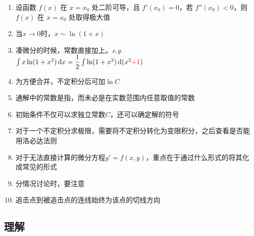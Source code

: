 \documentclass[../book.tex]{subfiles}
\begin{document}
    \begin{enumerate}
        \item 设函数 $f(x)$ 在 $x=x_0$ 处二阶可导，且 $f'(x_0)=0$，若 $f''(x_0)<0$，则 $f(x)$ 在 $x=x_0$ 处取得极大值
        \item 当$x \to 0$时，$x \sim \ln(1+x)$
        \item 凑微分的时候，常数直接加上。\emph{e.g.} $\int x\ln(1+x^2)\,\mathrm{d}x = \dfrac{1}{2}\int \ln(1+x^2)\,\mathrm{d}(x^2{\color{red}{ + 1}})$
        \item 为方便合并，不定积分后可加$\ln C$
        \item 通解中的常数是指{}，而未必是在实数范围内任意取值的常数
        \item 初始条件不仅可以求独立常数$C$，还可以确定解的符号
        \item 对于一个不定积分求极限，需要将不定积分转化为变限积分，之后查看是否能用洛必达法则
        \item 对于无法直接计算的微分方程$y' = f(x, y)$，重点在于通过什么形式的{\color{red}{换元（简单化）}}将其化成常见的形式
        \item 分情况讨论时，要注意
        \item 追击点到被追击点的连线始终为该点的切线方向
    \end{enumerate}

    \subsection{理解}
\end{document}
